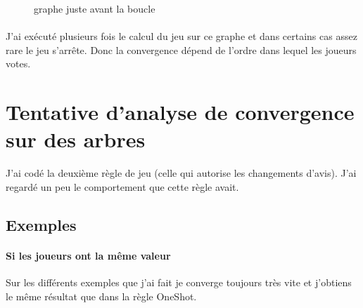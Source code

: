 \documentclass[12pt]{article}
\theoremstyle{defi}
\theoremstyle{not}
\theoremstyle{prob}
\begin{document}
      \begin{figure}
      \centering
      \caption{graphe juste avant la boucle}
      \label{fig:avant_boucle}
      \end{figure}

      \paragraph{}J'ai exécuté plusieurs fois le calcul du jeu sur ce graphe et dans certains cas assez rare le jeu s'arrête. Donc la convergence dépend de l'ordre dans lequel les joueurs votes.

\color{red}
  \section{Tentative d'analyse de convergence sur des arbres}
    J'ai codé la deuxième règle de jeu (celle qui autorise les changements d'avis). J'ai regardé un peu le comportement que cette règle avait.

    \subsection{Exemples}
      \paragraph{Si les joueurs ont la même valeur}
        Sur les différents exemples que j'ai fait je converge toujours très vite et j'obtiens le même résultat que dans la règle OneShot.
\end{document}
